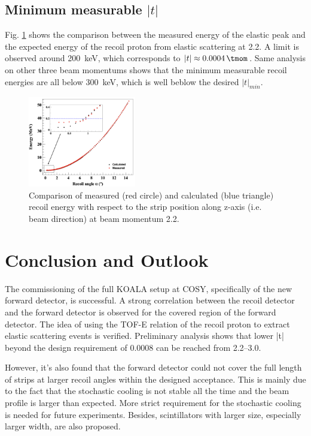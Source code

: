 \documentclass[number,5p]{elsarticle}
\begin{document}
\subsection{Minimum measurable $|t|$}
\label{sec:minimum_t}

Fig. \ref{fig:measured_vs_calculated} shows the comparison between the measured
energy of the elastic peak and the expected energy of the recoil proton from elastic scattering at \SI{2.2}{\momentum}.
A limit is observed around \SI{200}{\keV}, which corresponds to $|t| \approx  \SI{0.0004}{\tmom}$.
Same analysis on other three beam momentums shows that the minimum measurable
recoil energies are all below \SI{300}{\keV}, which is well beblow the desired $|t|_{min}$.

\begin{figure}[h!]
  \centering
  \includegraphics[width=0.42\textwidth]{./calc_vs_measured_2.2_angle_combined.png}
  \caption{
    Comparison of measured (red circle) and calculated (blue triangle) recoil energy with respect to the strip position along z-axis (i.e. beam direction) at beam momentum \SI{2.2}{\momentum}.}
  \label{fig:measured_vs_calculated}
\end{figure}


\section{Conclusion and Outlook}
\label{sec:conclusion}

The commissioning of the full KOALA setup at COSY, specifically of the new forward detector, is successful.
A strong correlation between the recoil detector and the forward detector is
observed for the covered region of the forward detector.
The idea of using the TOF-E relation of the recoil proton to extract elastic
scattering events is verified.
Preliminary analysis shows that lower |t| beyond the design requirement of \SI{0.0008}{\tmom} can be reached from \SIrange{2.2}{3.0}{\momentum}. 

However, it's also found that the forward detector could not cover the full
length of strips at larger recoil angles within the designed acceptance.
This is mainly due to the fact that the stochastic cooling is not stable all the time
and the beam profile is larger than expected.
More strict requirement for the stochastic cooling is needed for future experiments.
Besides, scintillators with larger size, especially larger width, are also proposed.
\end{document}
